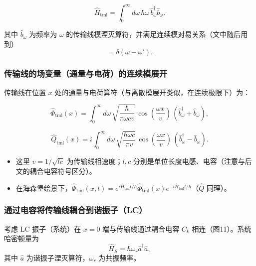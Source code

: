 \documentclass[12pt,a4paper,oneside]{ctexbook}
\begin{document}
\begin{equation}
\hat H_{\mathrm{tml}}=\int_0^\infty d\omega\,\hbar\omega\,\hat b_\omega^\dagger \hat b_\omega .
\tag{64}
\end{equation}

其中 $\hat b_\omega$ 为频率为 $\omega$ 的传输线模湮灭算符，并满足连续模对易关系（文中随后用到）
\begin{equation}
[\hat b_\omega,\hat b_{\omega'}^\dagger]=\delta(\omega-\omega') .
\end{equation}

\subsubsection{传输线的场变量（通量与电荷）的连续模展开}

传输线在位置 $x$ 处的通量与电荷算符（与离散模展开类似，在连续极限下）为：

\begin{equation}
\hat\Phi_{\mathrm{tml}}(x)=\int_0^\infty d\omega\,
\sqrt{\frac{\hbar}{\pi\omega c v}}\,
\cos\!\left(\frac{\omega x}{v}\right)\,(\hat b_\omega^\dagger+\hat b_\omega),
\tag{65a}
\end{equation}

\begin{equation}
\hat Q_{\mathrm{tml}}(x)= i\int_0^\infty d\omega\,
\sqrt{\frac{\hbar\omega c}{\pi v}}\,
\cos\!\left(\frac{\omega x}{v}\right)\,(\hat b_\omega^\dagger-\hat b_\omega).
\tag{65b}
\end{equation}

\begin{itemize}
  \item 这里 $v=1/\sqrt{lc}$ 为传输线相速度；$l,c$ 分别是单位长度电感、电容（注意与后文的耦合电容符号区分）。
  \item 在海森堡绘景下，$\hat\Phi_{\mathrm{tml}}(x,t)=e^{i\hat H_{\mathrm{tml}}t/\hbar}\hat\Phi_{\mathrm{tml}}(x)e^{-i\hat H_{\mathrm{tml}}t/\hbar}$（$\hat Q$ 同理）。
\end{itemize}

\subsubsection{通过电容将传输线耦合到谐振子（LC）}

考虑 LC 振子（系统）在 $x=0$ 端与传输线通过耦合电容 $C_k$ 相连（图11）。系统哈密顿量为
\begin{equation}
\hat H_S=\hbar\omega_r \hat a^\dagger \hat a ,
\end{equation}
其中 $\hat a$ 为谐振子湮灭算符，$\omega_r$ 为共振频率。
\end{document}
